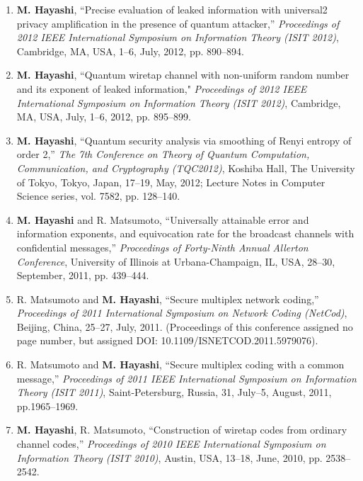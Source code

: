 \documentclass[a4paper,12pt,oneside]{article}
\begin{document}
\begin{enumerate}
    \item
    \textbf{M. Hayashi}, 
    ``Precise evaluation of leaked information with universal2 privacy amplification in the presence of quantum attacker,'' 
    {\em Proceedings of 2012 IEEE International Symposium on Information Theory (ISIT 2012)}, 
    Cambridge, MA, USA, 1--6, July, 2012, pp. 890--894. 
    
    \item	\textbf{M. Hayashi}, 
    ``Quantum wiretap channel with non-uniform random number and its exponent of leaked information," 
    {\em Proceedings of 2012 IEEE International Symposium on Information Theory (ISIT 2012)}, 
    Cambridge, MA, USA, July, 1--6, 2012, pp. 895--899. 
    
    \item	\textbf{M. Hayashi}, 
    ``Quantum security analysis via smoothing of Renyi entropy of order 2,''
    {\em The 7th Conference on Theory of Quantum Computation, Communication, and Cryptography (TQC2012)}, 
    Koshiba Hall, The University of Tokyo, Tokyo, Japan, 17--19, May, 2012; 
    Lecture Notes in Computer Science series, vol. 7582, pp. 128--140.
    
    \item	\textbf{M. Hayashi} and R. Matsumoto, 
    ``Universally attainable error and information exponents, and equivocation rate for the broadcast channels with confidential messages,''
    {\em Proceedings of Forty-Ninth Annual Allerton Conference}, 
    University of Illinois at Urbana-Champaign, IL, USA, 28--30, September, 2011, pp. 439--444. 
    
    \item	R. Matsumoto and \textbf{M. Hayashi}, 
    ``Secure multiplex network coding,'' 
    {\em Proceedings of 2011 International Symposium on Network Coding (NetCod)}, 
    Beijing, China, 25--27, July, 2011.
    (Proceedings of this conference assigned no page number, but assigned DOI: 10.1109/ISNETCOD.2011.5979076).
    
    \item R. Matsumoto and \textbf{M. Hayashi}, 
    ``Secure multiplex coding with a common message,'' 
    {\em Proceedings of 2011 IEEE International Symposium on Information Theory (ISIT 2011)}, 
    Saint-Petersburg, Russia, 31, July--5, August, 2011, pp.1965--1969.
    
    \item	\textbf{M. Hayashi}, R. Matsumoto, 
    ``Construction of wiretap codes from ordinary channel codes,'' 
    {\em Proceedings of 2010 IEEE International Symposium on Information Theory (ISIT 2010)}, 
    Austin, USA, 13--18, June, 2010, pp. 2538--2542.
    

\end{enumerate}
\end{document}

